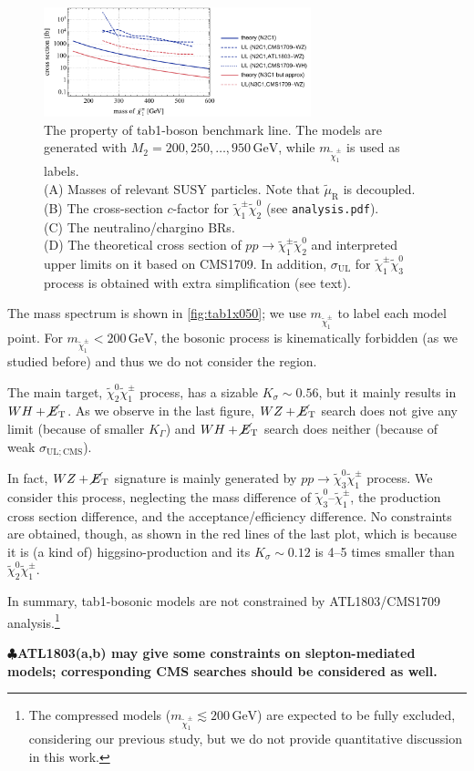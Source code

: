 \documentclass[a4paper,10pt,captions=tableheading,DIV=14]{scrartcl}
\numberwithin{equation}{section}
\newcommand\w[1]{_{\mathrm{#1}}}
\newcommand\unit[1]{\,\mathrm{#1}\xspace}
\newcommand\GeV{\unit{GeV}}
\newcommand{\TODO}[1]{{\textbf{\lstset{}\color{red}$\clubsuit$#1}}}
\newcommand\neut  [1][\relax]{{\tilde\chi^0_{#1}}}
\newcommand\charPM[1][\relax]{{\tilde\chi^\pm_{#1}}}
\newcommand\mET{\cancel{E}\w T}
\begin{document}
\begin{figure}[h]
  \includegraphics[height=90pt]{../plots/plot_tab1boson_limit.pdf}
  \caption{\label{fig:tab1x095}The property of tab1-boson benchmark line. The models are generated with $M_2=200,250,\dots,950\GeV$, while $m_{\charPM[1]}$ is used as labels.\\
 (A) Masses of relevant SUSY particles. Note that $\tilde\mu\w R$ is decoupled.\\
 (B) The cross-section $c$-factor for $\charPM[1]\neut[2]$ (see \texttt{analysis.pdf}).\\
 (C) The neutralino/chargino BRs.\\
 (D) The theoretical cross section of $pp\to\charPM[1]\neut[2]$ and interpreted upper limits on it based on CMS1709. In addition, $\sigma\w{UL}$ for $\charPM[1]\neut[3]$ process is obtained with extra simplification (see text).
}
\end{figure}


The mass spectrum is shown in \cref{fig:tab1x050}; we use $m_{\charPM[1]}$ to label each model point.
For $m_{\charPM[1]}<200\GeV$, the bosonic process is kinematically forbidden (as we studied before) and thus we do not consider the region.

The main target, $\neut[2]\charPM[1]$ process, has a sizable $K_\sigma\sim0.56$, but it mainly results in $WH+\mET$.
As we observe in the last figure, $WZ+\mET$ search does not give any limit (because of smaller $K_\Gamma$) and $WH+\mET$ search does neither (because of weak $\sigma\w{UL;CMS}$).

In fact, $WZ+\mET$ signature is mainly generated by $pp\to\neut[3]\charPM[1]$ process.
We consider this process, neglecting the mass difference of $\neut[3]$--$\charPM[1]$, the production cross section difference, and the acceptance/efficiency difference.
No constraints are obtained, though, as shown in the red lines of the last plot, which is because it is (a kind of) higgsino-production and its $K_\sigma\sim0.12$ is 4--5 times smaller than $\neut[2]\charPM[1]$.

In summary, tab1-bosonic models are not constrained by ATL1803/CMS1709 analysis.\footnote{The compressed models ($m_{\charPM[1]}\lesssim200\GeV$) are expected to be fully excluded, considering our previous study, but we do not provide quantitative discussion in this work.}


\clearpage

\TODO{ATL1803(a,b) may give some constraints on slepton-mediated models; corresponding CMS searches should be considered as well.}



\end{document}
